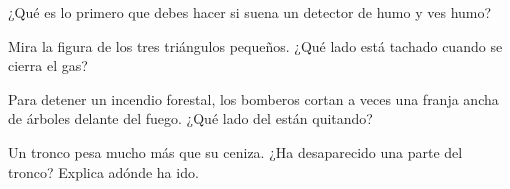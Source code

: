 \begin{exercise}[$\star$]\label{exo:g4:what-a-fire-needs:8}
¿Qué es lo primero que debes hacer si suena un detector de humo y ves
humo?
\end{exercise}

\begin{exercise}[$\star$]\label{exo:g4:what-a-fire-needs:9}
Mira la figura de los tres triángulos pequeños. ¿Qué lado está tachado
cuando se cierra el gas?
\end{exercise}

\begin{exercise}[$\star\star$]\label{exo:g4:what-a-fire-needs:10}
Para detener un incendio forestal, los bomberos cortan a veces una
franja ancha de árboles delante del fuego. ¿Qué lado del  están quitando?
\end{exercise}

\begin{exercise}[$\star\star$]\label{exo:g4:what-a-fire-needs:11}
Un tronco pesa mucho más que su ceniza. ¿Ha desaparecido una parte del
tronco? Explica adónde ha ido.
\end{exercise}
